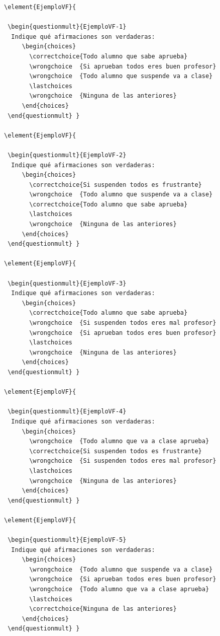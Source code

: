 \documentclass[10pt,a4paper]{report}
\begin{document}
{\footnotesize
\begin{verbatim}
\element{EjemploVF}{

 \begin{questionmult}{EjemploVF-1}
  Indique qué afirmaciones son verdaderas:
     \begin{choices}
       \correctchoice{Todo alumno que sabe aprueba}
       \wrongchoice  {Si aprueban todos eres buen profesor}
       \wrongchoice  {Todo alumno que suspende va a clase}
       \lastchoices
       \wrongchoice  {Ninguna de las anteriores}
     \end{choices}
 \end{questionmult} }

\element{EjemploVF}{

 \begin{questionmult}{EjemploVF-2}
  Indique qué afirmaciones son verdaderas:
     \begin{choices}
       \correctchoice{Si suspenden todos es frustrante}
       \wrongchoice  {Todo alumno que suspende va a clase}
       \correctchoice{Todo alumno que sabe aprueba}
       \lastchoices
       \wrongchoice  {Ninguna de las anteriores}
     \end{choices}
 \end{questionmult} }

\element{EjemploVF}{

 \begin{questionmult}{EjemploVF-3}
  Indique qué afirmaciones son verdaderas:
     \begin{choices}
       \correctchoice{Todo alumno que sabe aprueba}
       \wrongchoice  {Si suspenden todos eres mal profesor}
       \wrongchoice  {Si aprueban todos eres buen profesor}
       \lastchoices
       \wrongchoice  {Ninguna de las anteriores}
     \end{choices}
 \end{questionmult} }

\element{EjemploVF}{

 \begin{questionmult}{EjemploVF-4}
  Indique qué afirmaciones son verdaderas:
     \begin{choices}
       \wrongchoice  {Todo alumno que va a clase aprueba}
       \correctchoice{Si suspenden todos es frustrante}
       \wrongchoice  {Si suspenden todos eres mal profesor}
       \lastchoices
       \wrongchoice  {Ninguna de las anteriores}
     \end{choices}
 \end{questionmult} }

\element{EjemploVF}{

 \begin{questionmult}{EjemploVF-5}
  Indique qué afirmaciones son verdaderas:
     \begin{choices}
       \wrongchoice  {Todo alumno que suspende va a clase}
       \wrongchoice  {Si aprueban todos eres buen profesor}
       \wrongchoice  {Todo alumno que va a clase aprueba}
       \lastchoices
       \correctchoice{Ninguna de las anteriores}
     \end{choices}
 \end{questionmult} }
\end{verbatim}
}
\end{document}
